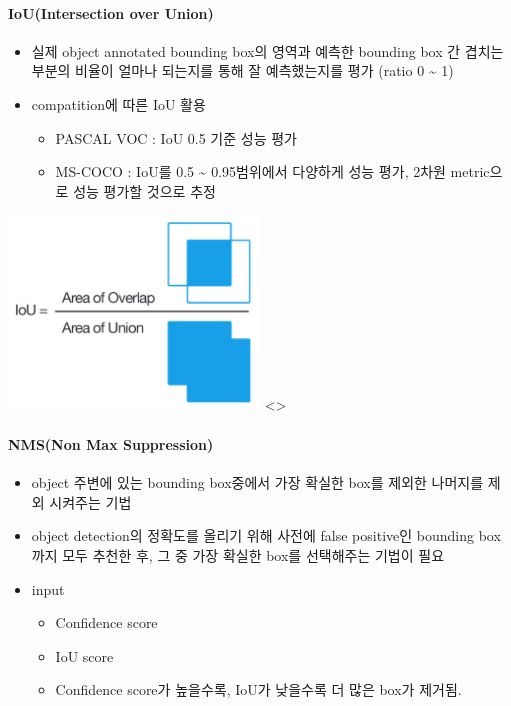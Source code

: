 \documentclass[
]{article}
\providecommand{\tightlist}{%
  \setlength{\itemsep}{0pt}\setlength{\parskip}{0pt}}
\begin{document}
\hypertarget{iouintersection-over-union}{%
\paragraph{IoU(Intersection over
Union)}\label{iouintersection-over-union}}

\begin{itemize}
\tightlist
\item
  실제 object annotated bounding box의 영역과 예측한 bounding box 간
  겹치는 부분의 비율이 얼마나 되는지를 통해 잘 예측했는지를 평가 (ratio
  0 \textasciitilde{} 1)
\item
  compatition에 따른 IoU 활용

  \begin{itemize}
  \tightlist
  \item
    PASCAL VOC : IoU 0.5 기준 성능 평가
  \item
    MS-COCO : IoU를 0.5 \textasciitilde{} 0.95범위에서 다양하게 성능
    평가, 2차원 metric으로 성능 평가할 것으로 추정
  \end{itemize}
\end{itemize}

\includegraphics[width=0.5\textwidth,height=\textheight]{figs/Chapter1-4.png}
\textless{}\center\textgreater{}

\hypertarget{nmsnon-max-suppression}{%
\paragraph{NMS(Non Max Suppression)}\label{nmsnon-max-suppression}}

\begin{itemize}
\tightlist
\item
  object 주변에 있는 bounding box중에서 가장 확실한 box를 제외한
  나머지를 제외 시켜주는 기법
\item
  object detection의 정확도를 올리기 위해 사전에 false positive인
  bounding box까지 모두 추천한 후, 그 중 가장 확실한 box를 선택해주는
  기법이 필요
\item
  input

  \begin{itemize}
  \tightlist
  \item
    Confidence score
  \item
    IoU score
  \item
    Confidence score가 높을수록, IoU가 낮을수록 더 많은 box가 제거됨.
  \end{itemize}
\end{itemize}
\end{document}
